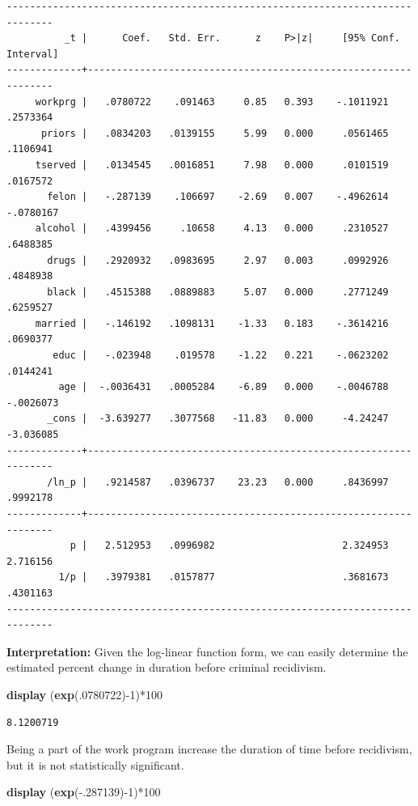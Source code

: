 \documentclass[
]{book}
\newenvironment{Shaded}{\begin{snugshade}}{\end{snugshade}}
\newcommand{\FunctionTok}[1]{\textcolor[rgb]{0.13,0.29,0.53}{\textbf{#1}}}
\newcommand{\KeywordTok}[1]{\textcolor[rgb]{0.13,0.29,0.53}{\textbf{#1}}}
\newcommand{\NormalTok}[1]{#1}
\begin{document}
\begin{verbatim}
------------------------------------------------------------------------------
          _t |      Coef.   Std. Err.      z    P>|z|     [95% Conf. Interval]
-------------+----------------------------------------------------------------
     workprg |   .0780722    .091463     0.85   0.393    -.1011921    .2573364
      priors |   .0834203   .0139155     5.99   0.000     .0561465    .1106941
     tserved |   .0134545   .0016851     7.98   0.000     .0101519    .0167572
       felon |   -.287139    .106697    -2.69   0.007    -.4962614   -.0780167
     alcohol |   .4399456     .10658     4.13   0.000     .2310527    .6488385
       drugs |   .2920932   .0983695     2.97   0.003     .0992926    .4848938
       black |   .4515388   .0889883     5.07   0.000     .2771249    .6259527
     married |   -.146192   .1098131    -1.33   0.183    -.3614216    .0690377
        educ |   -.023948    .019578    -1.22   0.221    -.0623202    .0144241
         age |  -.0036431   .0005284    -6.89   0.000    -.0046788   -.0026073
       _cons |  -3.639277   .3077568   -11.83   0.000     -4.24247   -3.036085
-------------+----------------------------------------------------------------
       /ln_p |   .9214587   .0396737    23.23   0.000     .8436997    .9992178
-------------+----------------------------------------------------------------
           p |   2.512953   .0996982                      2.324953    2.716156
         1/p |   .3979381   .0157877                      .3681673    .4301163
------------------------------------------------------------------------------
\end{verbatim}

\textbf{Interpretation:}
Given the log-linear function form, we can easily determine the estimated percent change in duration before criminal recidivism.

\begin{Shaded}
\begin{Highlighting}[]
    \KeywordTok{display}\NormalTok{ (}\FunctionTok{exp}\NormalTok{(.0780722){-}1)*100}
\end{Highlighting}
\end{Shaded}

\begin{verbatim}
8.1200719
\end{verbatim}

Being a part of the work program increase the duration of time before recidivism, but it is not statistically significant.

\begin{Shaded}
\begin{Highlighting}[]
    \KeywordTok{display}\NormalTok{ (}\FunctionTok{exp}\NormalTok{({-}.287139){-}1)*100}
\end{Highlighting}
\end{Shaded}
\end{document}
